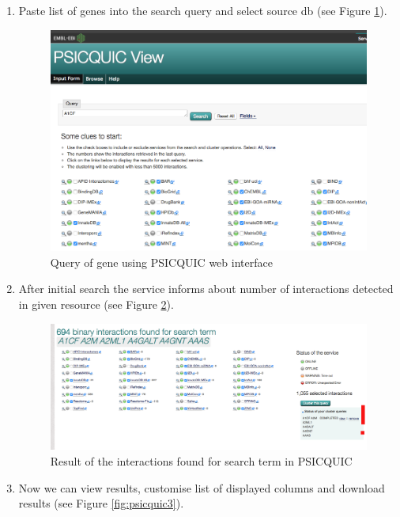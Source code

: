 \documentclass[11pt, oneside]{article}   	%
\begin{document}
\begin{enumerate}
   \item Paste list of genes into the search query and select source db (see Figure \ref{fig:psicquic1}).


   \begin{figure}[!h]
	\centering
	\includegraphics[width=\textwidth]{psicquic1}
	\caption{Query of gene using PSICQUIC web interface}
	\label{fig:psicquic1}
   \end{figure}

   \item After initial search the service informs about number of interactions detected in given resource (see Figure \ref{fig:psicquic2}).

   \begin{figure}[!h]
	\centering
	\includegraphics[width=\textwidth]{psicquic2}
	\caption{Result of the interactions found for search term in PSICQUIC}
	\label{fig:psicquic2}
   \end{figure}
   
   \item Now we can view results, customise list of displayed columns and download results (see Figure \ref{fig:psicquic3}).
   


\end{enumerate}
\end{document}
